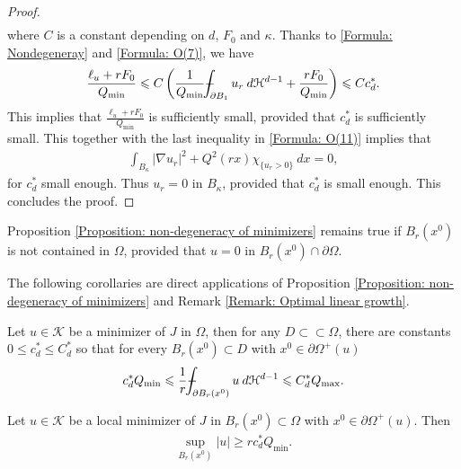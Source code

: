 \documentclass[11pt,reqno]{amsart}
\begin{document}
\begin{proof}
\begin{align}
    \end{align}
    where $C$ is a constant depending on $d$, $F_{0}$ and $\kappa$. Thanks to \eqref{Formula: Nondegeneray} and \eqref{Formula: O(7)}, we have
    \begin{align*}
    	\frac{\ell_{u}+rF_{0}}{Q_{\mathrm{min}}}\leqslant C\left(\frac{1}{Q_{\mathrm{min}}}\dashint_{\partial B_{1}}u_{r}\:d\mathcal{H}^{d-1}+\frac{rF_{0}}{Q_{\mathrm{min}}}\right)\leqslant Cc_{d}^{*}.
    \end{align*}
    This implies that $\frac{\ell_{u}+rF_{0}}{Q_{\mathrm{min}}}$ is sufficiently small, provided that $c_{d}^{*}$ is sufficiently small. This together with the last inequality in \eqref{Formula: O(11)} implies that
    \begin{align*}
    	\int_{B_{\kappa}}|\nabla u_{r}|^{2}+Q^{2}(rx)\chi_{\{u_{r}>0\}}\:dx=0,
    \end{align*}
    for $c_{d}^{*}$ small enough. Thus $u_{r}=0$ in $B_{\kappa}$, provided that $c_{d}^{*}$ is small enough. This concludes the proof.
\end{proof}
\begin{remark}
	Proposition \ref{Proposition: non-degeneracy of minimizers} remains true if $B_{r}(x^{0})$ is not contained in $\Omega$, provided that $u=0$ in $B_{r}(x^{0})\cap\partial\Omega$.
\end{remark}
The following corollaries are direct applications of Proposition \ref{Proposition: non-degeneracy of minimizers} and Remark \ref{Remark: Optimal linear growth}.
\begin{corollary}\label{Corollary: Weak solution-the second requirement}
	Let $u\in\mathcal{K}$ be a minimizer of $J$ in $\Omega$, then for any $D\subset\subset\Omega$, there are constants $0\leqslant c_{d}^{*}\leqslant C_{d}^{*}$ so that for every $B_{r}(x^{0})\subset D$ with $x^{0}\in\partial\varOmega^{+}(u)$
	\begin{align*}
		c_{d}^{*}Q_{\mathrm{min}}\leqslant\frac{1}{r}\dashint_{\partial B_{r}(x^{0})}u\:d\mathcal{H}^{d-1}\leqslant C_{d}^{*}Q_{\mathrm{max}}.
	\end{align*}
\end{corollary}
\begin{corollary}\label{Corollary: Optimal linear nondegeneracy}
	Let $u\in\mathcal{K}$ be a local minimizer of $J$ in $B_{r}(x^{0})\subset\Omega$ with $x^{0}\in\partial\varOmega^{+}(u)$. Then 
	\begin{align*}
		\sup_{B_{r}(x^{0})}|u|\geqslant rc_{d}^{*}Q_{\mathrm{min}}.
	\end{align*}
\end{corollary}
\end{document}
